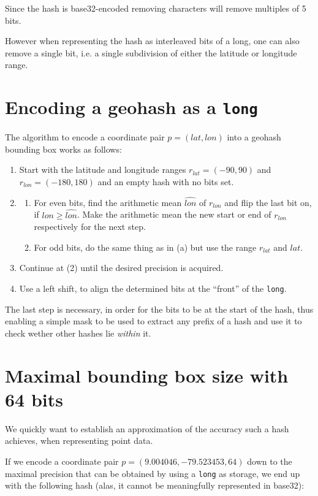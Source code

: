 \documentclass[a4paper,11pt,oneside]{scrartcl}
\begin{document}
Since the hash is base32-encoded removing characters will remove multiples of 5 bits.

However when representing the hash as interleaved bits of a long, one can also remove a single bit, i.e. a single subdivision of either the latitude or longitude range.

\section{Encoding a geohash as a \texttt{long}} %
\label{sec:encoding_a_geohash_as_a_}
The algorithm to encode a coordinate pair $p = (lat,lon)$ into a geohash bounding box works as follows:

\begin{enumerate}
	\item Start with the latitude and longitude ranges $r_{lat} = (-90,90)$ and $r_{lon} = (-180,180)$ and an empty hash with no bits set.
	\item \begin{enumerate}
		\item For even bits, find the arithmetic mean $\hat{lon}$ of $r_{lon}$ and flip the last bit on, if $lon \geq \hat{lon}$. Make the arithmetic mean the new start or end of $r_{lon}$ respectively for the next step.
		\item For odd bits, do the same thing as in (a) but use the range $r_{lat}$ and $lat$.
	\end{enumerate}
	\item Continue at (2) until the desired precision is acquired.
	\item Use a left shift, to align the determined bits at the “front” of the \texttt{long}.
\end{enumerate}

The last step is necessary, in order for the bits to be at the start of the hash, thus enabling a simple mask to be used to extract any prefix of a hash and use it to check wether other hashes lie \emph{within} it.


\section{Maximal bounding box size with 64 bits} %
\label{sec:maximal_precision_with_64_bits}
We quickly want to establish an approximation of the accuracy such a hash achieves, when representing point data.

If we encode a coordinate pair $p = (9.004046, -79.523453, 64)$ down to the maximal precision that can be obtained by using a \texttt{long} as storage, we end up with the following hash (alas, it cannot be meaningfully represented in base32):
\end{document}
